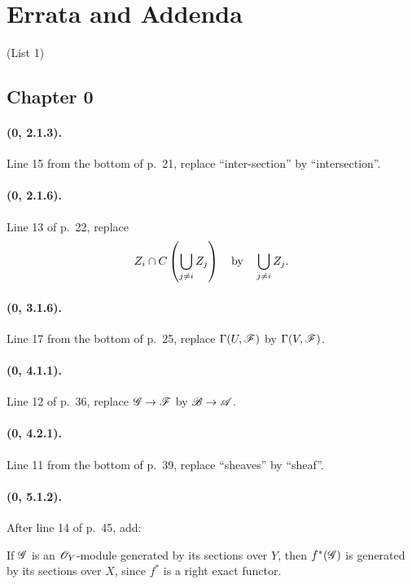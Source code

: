 \clearpage
{}
{}
\section*{Errata and Addenda}
\thispagestyle{plain}
\begin{center}
\large (List 1)
\end{center}

\subsection*{Chapter 0}

\paragraph{(0, 2.1.3).}
Line 15 from the bottom of p.~21, replace ``inter-section'' by
``intersection''.

\paragraph{(0, 2.1.6).}
Line 13 of p.~22, replace
\[
  Z_i\cap C\left(\bigcup_{j\ne i}Z_j\right)
  \quad\hbox{by}\quad
  \bigcup_{j\ne i}Z_j.
\]

\paragraph{(0, 3.1.6).}
Line 17 from the bottom of p.~25, replace
$\Gamma(U,\mathscr{F})$ by $\Gamma(V,\mathscr{F})$.

\paragraph{(0, 4.1.1).}
Line 12 of p.~36, replace $\mathscr{G}\to\mathscr{F}$ by
$\mathscr{B}\to\mathscr{A}$.

\paragraph{(0, 4.2.1).}
Line 11 from the bottom of p.~39, replace ``sheaves'' by ``sheaf''.

\paragraph{(0, 5.1.2).}
After line 14 of p.~45, add:

If $\mathscr{G}$ is an $\mathscr{O}_Y$-module generated by its sections over
$Y$, then $f^*(\mathscr{G})$ is generated by its sections over
$X$, since $f^*$ is a right exact functor.

